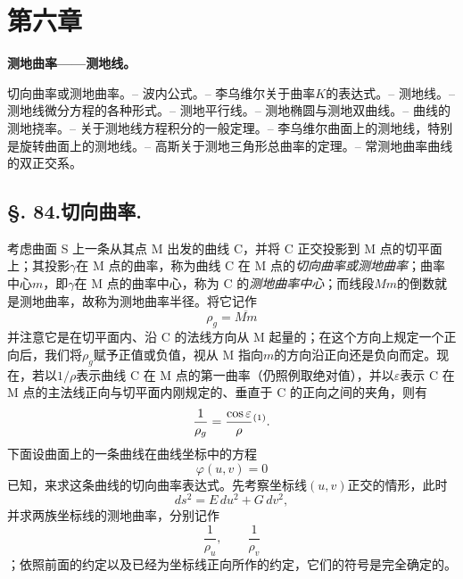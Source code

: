 \section*{第六章}
\begin{center}
{\Large\bfseries 测地曲率——测地线。}
\end{center}
\begin{center}\footnotesize
切向曲率或测地曲率。-- 波内公式。-- 李乌维尔关于曲率\(K\)的表达式。-- 测地线。-- 测地线微分方程的各种形式。-- 测地平行线。-- 测地椭圆与测地双曲线。-- 曲线的测地挠率。-- 关于测地线方程积分的一般定理。-- 李乌维尔曲面上的测地线，特别是旋转曲面上的测地线。-- 高斯关于测地三角形总曲率的定理。-- 常测地曲率曲线的双正交系。
\end{center}

\subsection*{\S. 84.\quad 切向曲率.}

考虑曲面 S 上一条从其点 M 出发的曲线 C，并将 C 正交投影到 M 点的切平面上；其投影\(\gamma\)在 M 点的曲率，称为曲线 C 在 M 点的\emph{切向曲率或测地曲率}；曲率中心\(m\)，即\(\gamma\)在 M 点的曲率中心，称为 C 的\emph{测地曲率中心}；而线段\(M m\)的倒数就是测地曲率，故称为测地曲率半径。将它记作
\[
  \rho_g=\overline{M m}
\]
并注意它是在切平面内、沿 C 的法线方向从 M 起量的；在这个方向上规定一个正向后，我们将\(\rho_g\)赋予正值或负值，视从 M 指向\(m\)的方向沿正向还是负向而定。现在，若以\(1/\rho\)表示曲线 C 在 M 点的第一曲率（仍照例取绝对值），并以\(\varepsilon\)表示 C 在 M 点的主法线正向与切平面内刚规定的、垂直于 C 的正向之间的夹角，则有
\[
 \frac1{\rho_g}=\frac{\cos\varepsilon}{\rho}\srcfnmark{1}.
\]
下面设曲面上的一条曲线在曲线坐标中的方程
\[
 \varphi(u,v)=0
\]
已知，来求这条曲线的切向曲率表达式。先考察坐标线\((u,v)\)正交的情形，此时
\[
 ds^2=E\,du^2+G\,dv^2,
\]
并求两族坐标线的测地曲率，分别记作
\[
 \frac1{\rho_u},\qquad \frac1{\rho_v}
\]
；依照前面的约定以及已经为坐标线正向所作的约定，它们的符号是完全确定的。

